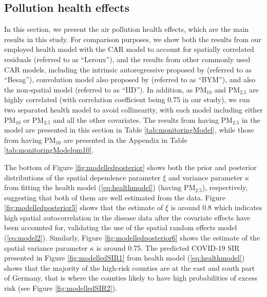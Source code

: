 \documentclass[12,]{article}
\begin{document}
\hypertarget{pollution-health-effects}{%
\subsection{Pollution health effects}\label{pollution-health-effects}}

In this section, we present the air pollution health effects, which are
the main results in this study. For comparison purposes, we show both
the results from our employed health model with the
\textcite{Leroux1999} CAR model to account for spatially correlated
residuals (referred to as ``Leroux''), and the results from other
commonly used CAR models, including the intrinsic autoregressive
proposed by \textcite{Besag1991} (referred to as ``Besag''), convolution
model also proposed by \textcite{Besag1991} (referred to as ``BYM''),
and also the non-spatial model (referred to as ``IID''). In addition, as
PM\(_{10}\) and PM\(_{2.5}\) are highly correlated (with correlation
coefficient being 0.75 in our study), we run two separated health model
to avoid collinearity, with each model including either PM\(_{10}\) or
PM\(_{2.5}\) and all the other covariates. The results from having
PM\(_{2.5}\) in the model are presented in this section in Table
\ref{tab:monitoringModel}, while those from having PM\(_{10}\) are
presented in the Appendix in Table \ref{tab:monitoringModelpm10}.

The bottom of Figure \ref{fig:modelledposterior} shows both the prior
and posterior distributions of the spatial dependence parameter \(\xi\)
and variance parameter \(\kappa\) from fitting the health model
(\ref{eq:healthmodel}) (having PM\(_{2.5}\)), respectively, suggesting
that both of them are well estimated from the data. Figure
\ref{fig:modelledposterior5} shows that the estimate of \(\xi\) is
around 0.8 which indicates high spatial autocorrelation in the disease
data after the covariate effects have been accounted for, validating the
use of the spatial random effects model (\ref{eq:model2}). Similarly,
Figure \ref{fig:modelledposterior6} shows the estimate of the spatial
variance parameter \(\kappa\) is around 0.75. The predicted COVID-19 SIR
presented in Figure \ref{fig:modelledSIR1} from health model
(\ref{eq:healthmodel}) shows that the majority of the high‐risk counties
are at the east and south part of Germany, that is where the counties
likely to have high probabilities of excess risk (see Figure
\ref{fig:modelledSIR2}).
\end{document}
